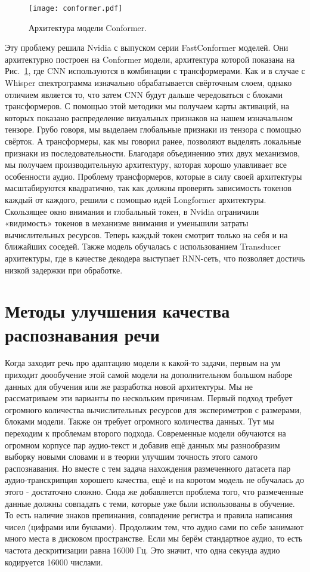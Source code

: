 \begin{figure}[!t]
  \centering
  \texttt{[image: conformer.pdf]}
  \caption{Архитектура модели Conformer.}
  \label{fig:conformer}
\end{figure}

Эту проблему решила Nvidia с выпуском серии FastConformer моделей\cite{rekesh2023fast}. 
Они архитектурно построен на Conformer модели\cite{gulati2020conformers}, архитектура которой показана на Рис.~\ref{fig:conformer}, где CNN используются в комбинации с трансформерами.
Как и в случае с Whisper спектрограмма изначально обрабатывается свёрточным слоем, однако отличием является то, что затем CNN будут дальше чередоваться с блоками трансформеров.
С помощью этой методики мы получаем карты активаций, на которых показано распределение визуальных признаков на нашем изначальном тензоре.
Грубо говоря, мы выделаем глобальные признаки из тензора с помощью свёрток.
А трансформеры, как мы говорил ранее, позволяют выделять локальные признаки из последовательности.
Благодаря объединению этих двух механизмов, мы получаем производительную архитектуру, которая хорошо улавливает все особенности аудио.
Проблему трансформеров, которые в силу своей архитектуры масштабируются квадратично, так как должны проверять зависимость токенов каждый от каждого, решили с помощью идей Longformer\cite{beltagy2020longformer} архитектуры.
Скользящее окно внимания и глобальный токен, в Nvidia ограничили «видимость» токенов в механизме внимания и уменьшили затраты вычислительных ресурсов.
Теперь каждый токен смотрит только на себя и на ближайших соседей.
Также модель обучалась с использованием Transducer архитектуры, где в качестве декодера выступает RNN-сеть, что позволяет достичь низкой задержки при обработке.


\section{Методы улучшения качества распознавания речи}
Когда заходит речь про адаптацию модели к какой-то задачи, первым на ум приходит доообучение этой самой модели на дополнительном большом наборе данных для обучения или же разработка новой архитектуры.
Мы не рассматриваем эти варианты по нескольким причинам.
Первый подход требует огромного количества вычислительных ресурсов для экспериметров с размерами, блоками модели.
Также он требует огромного количества данных.
Тут мы переходим к проблемам второго подхода.
Современные модели обучаются на огромном корпусе пар аудио-текст и добавив ещё данных мы разнообразим выборку новыми словами и в теории улучшим точность этого самого распознавания.
Но вместе с тем задача нахождения размеченного датасета пар аудио-транскрипция хорошего качества, ещё и на коротом модель не обучалась до этого - достаточно сложно.
Сюда же добавляется проблема того, что размеченные данные должны совпадать с теми, которые уже были использованы в обучение.
То есть наличие знаков препинания, совпадение регистра и правила написания чисел (цифрами или буквами).
Продолжим тем, что аудио сами по себе занимают много места в дисковом пространстве.
Если мы берём стандартное аудио, то есть частота дескритизации равна 16000 Гц.
Это значит, что одна секунда аудио кодируется 16000 числами.

